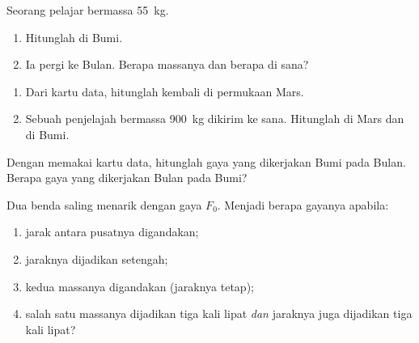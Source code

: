 \begin{exercise}[$\star$]\label{exo:g10:universal-gravitation:2}
Seorang pelajar bermassa \qty{55}{kg}.
\begin{enumerate}
  \item Hitunglah  di Bumi.
  \item Ia pergi ke Bulan. Berapa massanya dan berapa  di sana?
\end{enumerate}
\end{exercise}

\begin{exercise}[$\star$]\label{exo:g10:universal-gravitation:3}
\begin{enumerate}
  \item Dari kartu data, hitunglah kembali  di
        permukaan Mars.
  \item Sebuah penjelajah bermassa \qty{900}{kg} dikirim ke sana.
        Hitunglah  di Mars dan  di Bumi.
\end{enumerate}
\end{exercise}

\begin{exercise}[$\star$]\label{exo:g10:universal-gravitation:4}
Dengan memakai kartu data, hitunglah gaya yang dikerjakan Bumi pada
Bulan. Berapa gaya yang dikerjakan Bulan pada Bumi?
\end{exercise}

\begin{exercise}[$\star$]\label{exo:g10:universal-gravitation:5}
Dua benda saling menarik dengan gaya $F_0$. Menjadi berapa gayanya
apabila:
\begin{enumerate}
  \item jarak antara pusatnya digandakan;
  \item jaraknya dijadikan setengah;
  \item kedua massanya digandakan (jaraknya tetap);
  \item salah satu massanya dijadikan tiga kali lipat \emph{dan}
        jaraknya juga dijadikan tiga kali lipat?
\end{enumerate}
\end{exercise}

